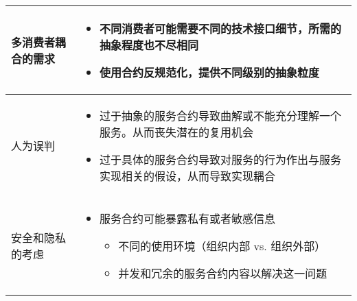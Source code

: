 \begin{longtable}{|m{3cm}<{\centering}|m{12cm}|}
    \hline
    多消费者耦合的需求
    & 
    \vspace{-1.3em}
    \begin{itemize}[leftmargin=1.5em,itemsep=-3pt,topsep=-3pt]
        \item 不同消费者可能需要不同的技术接口细节，所需的抽象程度也不尽相同
        \item 使用合约反规范化，提供不同级别的抽象粒度
    \vspace{-1.5em}
    \end{itemize}  
    \\ \hline
    人为误判
    & 
    \vspace{-1.3em}
    \begin{itemize}[leftmargin=1.5em,itemsep=-3pt,topsep=-3pt]
        \item 过于抽象的服务合约导致曲解或不能充分理解一个服务。从而丧失潜在的复用机会
        \item 过于具体的服务合约导致对服务的行为作出与服务实现相关的假设，从而导致实现耦合
    \vspace{-1.5em}
    \end{itemize}  
    \\ \hline
    安全和隐私的考虑
    & 
    \vspace{-1.3em}
    \begin{itemize}[leftmargin=1.5em,itemsep=-3pt,topsep=-3pt]
        \item 服务合约可能暴露私有或者敏感信息
        \begin{itemize}[leftmargin=1.5em,itemsep=-3pt,topsep=-3pt]
            \item 不同的使用环境（组织内部 vs. 组织外部）
            \item 并发和冗余的服务合约内容以解决这一问题
        \end{itemize}
    \vspace{-1.2em}
    \end{itemize}  
    \\ \hline
\end{longtable}